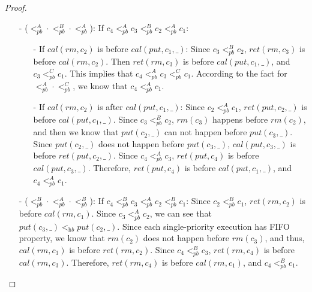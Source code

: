\begin {proof}
\begin{itemize}
\item[-]  ($<_{\textit{pb}}^A \cdot <_{\textit{pb}}^B \cdot <_{\textit{pb}}^A$): If $c_4 <_{\textit{pb}}^A c_3 <_{\textit{pb}}^B c_2 <_{\textit{pb}}^A c_1$:
    \begin{itemize}
    \setlength{\itemsep}{0.5pt}
    \item[-] If $\textit{cal}(\textit{rm},c_2)$ is before $\textit{cal}(\textit{put},c_1,\_)$: Since $c_3 <_{\textit{pb}}^B c_2$, $\textit{ret}(\textit{rm},c_3)$ is before $\textit{cal}(\textit{rm},c_2)$. Then $\textit{ret}(\textit{rm},c_3)$ is before $\textit{cal}(\textit{put},c_1,\_)$, and $c_3 <_{\textit{pb}}^C c_1$. This implies that $c_4 <_{\textit{pb}}^A c_3 <_{\textit{pb}}^C c_1$. According to the fact for $<_{\textit{pb}}^A \cdot <_{\textit{pb}}^C$, we know that $c_4  <_{\textit{pb}}^A c_1$.

    \item[-] If $\textit{cal}(\textit{rm},c_2)$ is after $\textit{cal}(\textit{put},c_1,\_)$: Since $c_2 <_{\textit{pb}}^A c_1$, $\textit{ret}(\textit{put},c_2,\_)$ is before $\textit{cal}(\textit{put},c_1,\_)$. Since $c_3 <_{\textit{pb}}^B c_2$, $\textit{rm}(c_3)$ happens before $\textit{rm}(c_2)$, and then we know that $\textit{put}(c_2,\_)$ can not happen before $\textit{put}(c_3,\_)$. Since $\textit{put}(c_2,\_)$ does not happen before $\textit{put}(c_3,\_)$, $\textit{cal}(\textit{put},c_3,\_)$ is before $\textit{ret}(\textit{put},c_2,\_)$. Since $c_4 <_{\textit{pb}}^A c_3$, $\textit{ret}(\textit{put},c_4)$ is before $\textit{cal}(\textit{put},c_3,\_)$. Therefore, $\textit{ret}(\textit{put},c_4)$ is before $\textit{cal}(\textit{put},c_1,\_)$, and $c_4 <_{\textit{pb}}^A c_1$.
    \end{itemize}

\item[-]  ($<_{\textit{pb}}^B \cdot <_{\textit{pb}}^A \cdot <_{\textit{pb}}^B$): If $c_4 <_{\textit{pb}}^B c_3 <_{\textit{pb}}^A c_2 <_{\textit{pb}}^B c_1$: Since $c_2 <_{\textit{pb}}^B c_1$, $\textit{ret}(\textit{rm},c_2)$ is before $\textit{cal}(\textit{rm},c_1)$. Since $c_3 <_{\textit{pb}}^A c_2$, we can see that $\textit{put}(c_3,\_) <_{\textit{hb}} \textit{put}(c_2,\_)$. Since each single-priority execution has FIFO property, we know that $\textit{rm}(c_2)$ does not happen before $\textit{rm}(c_3)$, and thus, $\textit{cal}(\textit{rm},c_3)$ is before $\textit{ret}(\textit{rm},c_2)$. Since $c_4 <_{\textit{pb}}^B c_3$, $\textit{ret}(\textit{rm},c_4)$ is before $\textit{cal}(\textit{rm},c_3)$. Therefore, $\textit{ret}(\textit{rm},c_4)$ is before $\textit{cal}(\textit{rm},c_1)$, and $c_4 <_{\textit{pb}}^B c_1$.


\end{itemize}
\end{proof}

